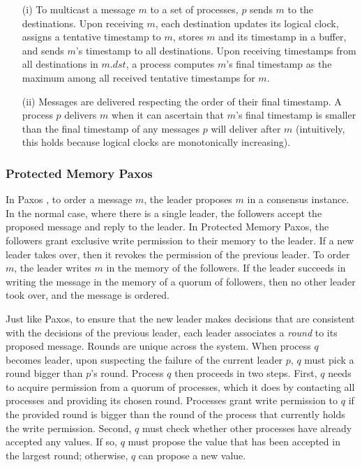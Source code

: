 \begin{itemize}
\item[(i)] To multicast a message $m$ to a set of processes, $p$ sends $m$ to the destinations.
Upon receiving $m$, each destination updates its logical clock, assigns a tentative timestamp to $m$, stores $m$ and its timestamp in a buffer, and sends $m$'s timestamp to all destinations.
Upon receiving timestamps from all destinations in $m.dst$, a process computes $m$'s final timestamp as the maximum among all received tentative timestamps for $m$.
\item[(ii)]Messages are delivered respecting the order of their final timestamp.
A process $p$ delivers $m$ when it can ascertain that $m$'s final timestamp is smaller than the final timestamp of any messages $p$ will deliver after $m$ (intuitively, this holds because logical clocks are monotonically increasing).
\end{itemize}

\subsubsection{Protected Memory Paxos}

In Paxos \cite{L98}, to order a message $m$, the leader proposes $m$ in a consensus instance.
In the normal case, where there is a single leader, the followers accept the proposed message and reply to the leader.
In Protected Memory Paxos, the followers grant exclusive write permission to their memory to the leader.
If a new leader takes over, then it revokes the permission of the previous leader.
To order $m$, the leader writes $m$ in the memory of the followers.
If the leader succeeds in writing the message in the memory of a quorum of followers, then no other leader took over, and the message is ordered.

Just like Paxos, to ensure that the new leader makes decisions that are consistent with the decisions of the previous leader, each leader associates a \emph{round} to its proposed message.
Rounds are unique across the system.
When process $q$ becomes leader, upon suspecting the failure of the current leader $p$, $q$ must pick a round bigger than $p$'s round.
Process $q$ then proceeds in two steps.
First, $q$ needs to acquire permission from a quorum of processes, which it does by contacting all processes and providing its chosen round.
Processes grant write permission to $q$ if the provided round is bigger than the round of the process that currently holds the write permission.
Second, $q$ must check whether other processes have already accepted any values.
If so, $q$ must propose the value that has been accepted in the largest round; otherwise, $q$ can propose a new value.

